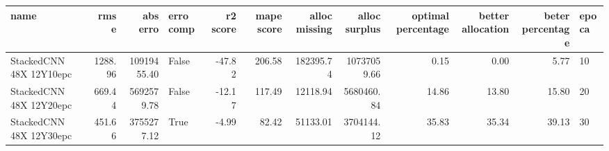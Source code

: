 \begin{tabular}{lrrlrrrrrrrl}
\toprule
name & rmse & abs erro & erro comp & r2 score & mape score & alloc missing & alloc surplus & optimal percentage & better allocation & beter percentage & epoca \\
\midrule
StackedCNN 48X 12Y10epc & 1288.96 & 10919455.40 & False & -47.82 & 206.58 & 182395.74 & 10737059.66 & 0.15 & 0.00 & 5.77 & 10 \\
StackedCNN 48X 12Y20epc & 669.44 & 5692579.78 & False & -12.17 & 117.49 & 12118.94 & 5680460.84 & 14.86 & 13.80 & 15.80 & 20 \\
StackedCNN 48X 12Y30epc & 451.66 & 3755277.12 & True & -4.99 & 82.42 & 51133.01 & 3704144.12 & 35.83 & 35.34 & 39.13 & 30 \\
\bottomrule
\end{tabular}

